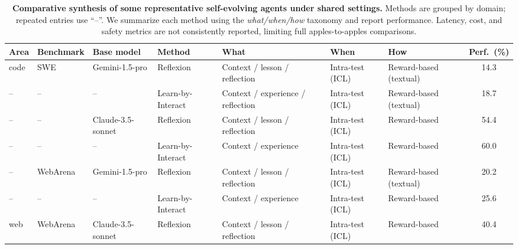 \documentclass[10pt]{article} %
\begin{document}
\begin{table}[t]
\footnotesize
\centering
\caption{\textbf{Comparative synthesis of some representative self-evolving agents under shared settings.}
Methods are grouped by domain; repeated entries use ``--''. We summarize each method using the
\textit{what/when/how} taxonomy and report performance. Latency, cost, and safety metrics are not
consistently reported, limiting full apples-to-apples comparisons.}
\label{tab:comparative_synthesis_tasks}

\renewcommand{\arraystretch}{1.05}
\setlength{\tabcolsep}{1.5pt}

\begin{tabularx}{\textwidth}{l l p{2.0cm} p{2.4cm} X X X c}
\toprule
\textbf{Area} & \textbf{Benchmark} & \textbf{Base model} & \textbf{Method}
& \textbf{What} & \textbf{When} & \textbf{How} & \textbf{Perf.\ (\%)} \\
\midrule

code & SWE & Gemini-1.5-pro & Reflexion \citep{shinn2023reflexion}
& Context / lesson / reflection
& Intra-test (ICL)
& Reward-based (textual)
& 14.3 \\

-- & -- & -- & Learn-by-Interact \citep{su2025learnbyinteractdatacentricframeworkselfadaptive}
& Context / experience / reflection
& Intra-test (ICL)
& Reward-based (textual)
& 18.7 \\

-- & -- & Claude-3.5-sonnet & Reflexion \citep{shinn2023reflexion}
& Context / lesson / reflection
& Intra-test (ICL)
& Reward-based
& 54.4 \\

-- & -- & -- & Learn-by-Interact \citep{su2025learnbyinteractdatacentricframeworkselfadaptive}
& Context / experience
& Intra-test (ICL)
& Reward-based
& 60.0 \\

-- & WebArena & Gemini-1.5-pro & Reflexion \citep{shinn2023reflexion}
& Context / lesson / reflection
& Intra-test (ICL)
& Reward-based (textual)
& 20.2 \\

-- & -- & -- & Learn-by-Interact \citep{su2025learnbyinteractdatacentricframeworkselfadaptive}
& Context / experience
& Intra-test (ICL)
& Reward-based
& 25.6 \\
\midrule

web & WebArena & Claude-3.5-sonnet & Reflexion \citep{shinn2023reflexion}
& Context / lesson / reflection
& Intra-test (ICL)
& Reward-based
& 40.4 \\


\end{tabularx}
\end{table}
\end{document}
